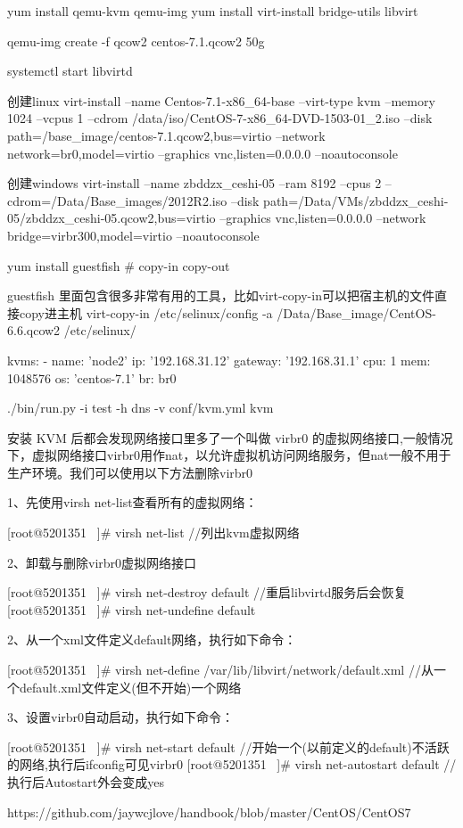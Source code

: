 yum install qemu-kvm qemu-img
yum install virt-install  bridge-utils libvirt

qemu-img create -f qcow2 centos-7.1.qcow2 50g

systemctl start libvirtd

创建linux
virt-install --name Centos-7.1-x86_64-base  --virt-type kvm --memory 1024 --vcpus 1 --cdrom /data/iso/CentOS-7-x86_64-DVD-1503-01_2.iso  --disk path=/base_image/centos-7.1.qcow2,bus=virtio   --network network=br0,model=virtio --graphics vnc,listen=0.0.0.0 --noautoconsole

创建windows
virt-install --name zbddzx_ceshi-05  --ram 8192 --cpus 2 --cdrom=/Data/Base_images/2012R2.iso  --disk path=/Data/VMs/zbddzx_ceshi-05/zbddzx_ceshi-05.qcow2,bus=virtio  --graphics vnc,listen=0.0.0.0  --network bridge=virbr300,model=virtio --noautoconsole

yum install guestfish   # copy-in copy-out

guestfish 里面包含很多非常有用的工具，比如virt-copy-in可以把宿主机的文件直接copy进主机
virt-copy-in /etc/selinux/config  -a /Data/Base_image/CentOS-6.6.qcow2  /etc/selinux/


kvms:
  - name: 'node2'
    ip: '192.168.31.12'
    gateway: '192.168.31.1'
    cpu: 1
    mem: 1048576
    os: 'centos-7.1'
    br: br0

./bin/run.py -i test -h dns -v conf/kvm.yml  kvm


安装 KVM 后都会发现网络接口里多了一个叫做 virbr0 的虚拟网络接口,一般情况下，虚拟网络接口virbr0用作nat，以允许虚拟机访问网络服务，但nat一般不用于生产环境。我们可以使用以下方法删除virbr0

1、先使用virsh net-list查看所有的虚拟网络：

[root@5201351 ~]# virsh net-list               //列出kvm虚拟网络


2、卸载与删除virbr0虚拟网络接口

[root@5201351 ~]# virsh net-destroy default    //重启libvirtd服务后会恢复
[root@5201351 ~]# virsh net-undefine default


2、从一个xml文件定义default网络，执行如下命令：

[root@5201351 ~]# virsh net-define /var/lib/libvirt/network/default.xml   //从一个default.xml文件定义(但不开始)一个网络


3、设置virbr0自动启动，执行如下命令：

[root@5201351 ~]# virsh net-start default           //开始一个(以前定义的default)不活跃的网络,执行后ifconfig可见virbr0
[root@5201351 ~]# virsh net-autostart default       //执行后Autostart外会变成yes


https://github.com/jaywcjlove/handbook/blob/master/CentOS/CentOS7%
